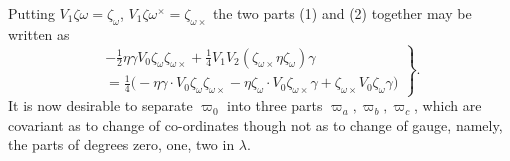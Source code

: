 \documentclass[11pt]{article}
\begin{document}
\indent Putting $V_1\zeta\omega=\zeta_\omega$, $V_1\zeta\omega^\times=\zeta_{\omega\times}$ the two parts (1) and (2) together may be written as
\begin{equation}
\left.\begin{aligned}
-\tfrac12\eta\gamma V_0\zeta_\omega\zeta_{\omega\times}+\tfrac14V_1V_2(\zeta_{\omega\times}\eta\zeta_\omega)\gamma\\
=\tfrac14\bigl(-\eta\gamma\mathbin{\cdot}V_0\zeta_\omega\zeta_{\omega\times}-\eta\zeta_\omega\mathbin{\cdot}V_0\zeta_{\omega\times}\gamma+\zeta_{\omega\times}V_0\zeta_\omega\gamma\bigr)
\end{aligned}\right\}.\tag{13}
\end{equation}
It is now desirable to separate $\varpi_0$ into three parts $\varpi_a,\varpi_b,\varpi_c$, which are covariant as to change of co-ordinates though not as to change of gauge, namely, the parts of degrees zero, one, two in $\lambda$.
\end{document}
